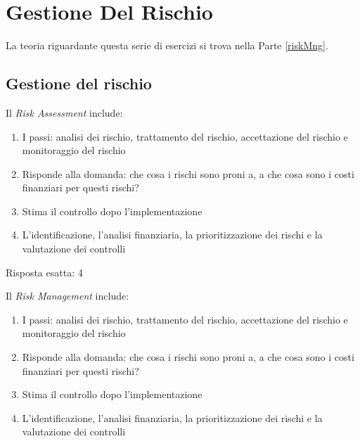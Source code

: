 \chapter{Gestione Del Rischio}

La teoria riguardante questa serie di esercizi si trova nella
Parte \ref{riskMng}.

\section{Gestione del rischio}

\label{esGestRisk}

\begin{Exercise} [
  title={Quiz},
  label={gestRisk1}
  ]

  \Question Il \textit{Risk Assessment} include:

\begin{enumerate}
 \item I passi: analisi dei rischio, trattamento del rischio, accettazione del
rischio e monitoraggio del rischio
 \item Risponde alla domanda: che cosa i rischi sono proni a, a che cosa sono i
costi finanziari per questi rischi?
 \item Stima il controllo dopo l'implementazione
 \item L'identificazione, l'analisi finanziaria, la prioritizzazione dei rischi
e la valutazione dei controlli
\end{enumerate}

\end{Exercise}


\begin{Answer} [
  ref={gestRisk1},
  number={1}
  ]

  \Question Risposta esatta: 4

\end{Answer}


\begin{Exercise} [
  title={Quiz},
  label={gestRisk2}
  ]

  \Question Il \textit{Risk Management} include:
\begin{enumerate}
 \item I passi: analisi dei rischio, trattamento del rischio, accettazione del
rischio e monitoraggio del rischio
 \item Risponde alla domanda: che cosa i rischi sono proni a, a che cosa sono i
costi finanziari per questi rischi?
 \item Stima il controllo dopo l'implementazione
 \item L'identificazione, l'analisi finanziaria, la prioritizzazione dei rischi
e la valutazione dei controlli
\end{enumerate}
\end{Exercise}


